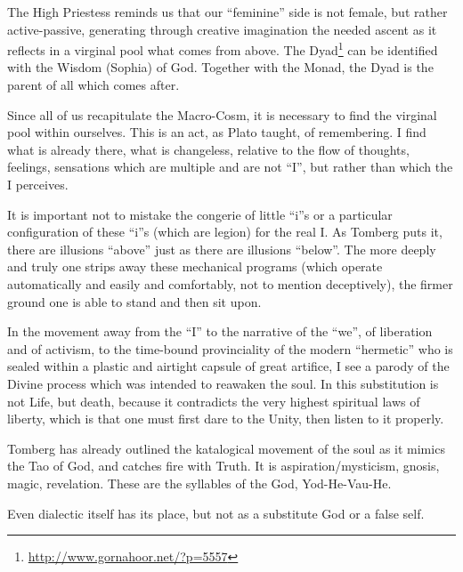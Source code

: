 The High Priestess reminds us that our ``feminine'' side is not female, but rather active-passive, generating through creative imagination the needed ascent as it reflects in a virginal pool what comes from above. The Dyad\footnote{\url{http://www.gornahoor.net/?p=5557}} can be identified with the Wisdom (Sophia) of God. Together with the Monad, the Dyad is the parent of all which comes after.

Since all of us recapitulate the Macro-Cosm, it is necessary to find the virginal pool within ourselves. This is an act, as Plato taught, of remembering. I find what is already there, what is changeless, relative to the flow of thoughts, feelings, sensations which are multiple and are not ``I'', but rather than which the I perceives.

It is important not to mistake the congerie of little ``i''s or a particular configuration of these ``i''s (which are legion) for the real I. As Tomberg puts it, there are illusions ``above'' just as there are illusions ``below''. The more deeply and truly one strips away these mechanical programs (which operate automatically and easily and comfortably, not to mention deceptively), the firmer ground one is able to stand and then sit upon.

In the movement away from the ``I'' to the narrative of the ``we'', of liberation and of activism, to the time-bound provinciality of the modern ``hermetic'' who is sealed within a plastic and airtight capsule of great artifice, I see a parody of the Divine process which was intended to reawaken the soul. In this substitution is not Life, but death, because it contradicts the very highest spiritual laws of liberty, which is that one must first dare to the Unity, then listen to it properly.

Tomberg has already outlined the katalogical movement of the soul as it mimics the Tao of God, and catches fire with Truth. It is aspiration/mysticism, gnosis, magic, revelation. These are the syllables of the God, Yod-He-Vau-He.

Even dialectic itself has its place, but not as a substitute God or a false self.



